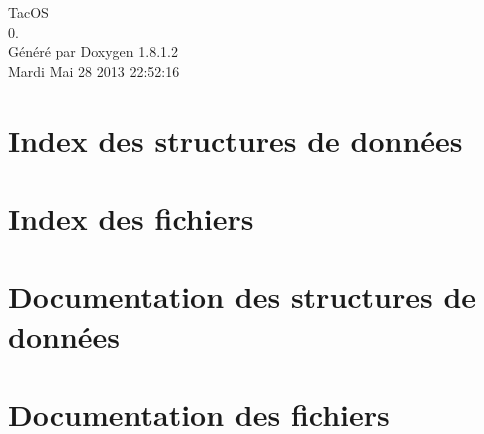 \documentclass{book}
\begin{document}
\hypersetup{pageanchor=false,citecolor=blue}
\begin{titlepage}
\vspace*{7cm}
\begin{center}
{\Large Tac\-O\-S \\[1ex]\large 0. }\\
\vspace*{1cm}
{\large Généré par Doxygen 1.8.1.2}\\
\vspace*{0.5cm}
{\small Mardi Mai 28 2013 22:52:16}\\
\end{center}
\end{titlepage}
\clearemptydoublepage
{}
\tableofcontents
\clearemptydoublepage
{}
\hypersetup{pageanchor=true,citecolor=blue}
\chapter{Index des structures de données}

\chapter{Index des fichiers}

\chapter{Documentation des structures de données}











\chapter{Documentation des fichiers}
























































\printindex
\end{document}

